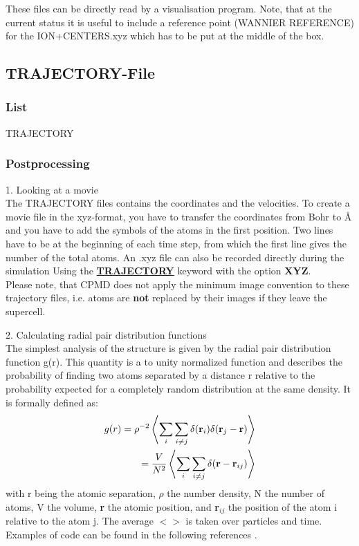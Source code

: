 \documentclass[twoside,10pt,titlepage,a4paper]{article}
\newcommand{\referto}[2]{\hyperlink{#1}{#2}}
\newcommand{\referto}[2]{\htmlref{#2}{#1}}
\newcommand{\refkeyword}[1]{%
\referto{#1}{\textbf{#1}}%
\index{#1}%
}%
\begin{document}
  These files can be directly read by a visualisation program. Note, that at
the current status it is useful to include a reference point (WANNIER
REFERENCE) for the ION+CENTERS.xyz which has to be put at the middle of the
box.

\subsection{TRAJECTORY-File}

\subsubsection{List}

TRAJECTORY

\subsubsection{Postprocessing}

1. Looking at a movie\hfill\\
The TRAJECTORY files contains the coordinates and the
velocities. To create a movie file in the xyz-format, you have to transfer the
coordinates from Bohr to {\AA} and you have to add the symbols of the atoms in
the first position. Two lines have to be at the beginning of each time step,
from which the first line gives the number of the total atoms. An .xyz
file can also be recorded directly during the simulation Using the
\refkeyword{TRAJECTORY} keyword with the option {\bf XYZ}.\\
Please note, that CPMD does not apply the minimum image convention
to these trajectory files, i.e. atoms are \textbf{not} replaced by their
images if they leave the supercell.

\medskip

 2. Calculating radial pair distribution functions\hfill\\
The simplest analysis of the structure is
given by the radial pair distribution function g(r). This quantity is a to
unity normalized function and describes the probability of finding two atoms
separated by a distance r relative to the probability expected for a completely
random distribution at the same density. It is formally defined as:
\begin{eqnarray*}
g(r)=\rho^{-2}\left < \sum_i\sum_{i\neq j} \delta({\bf r}_i)
\delta({\bf r}_j-{\bf r}) \right > \nonumber\\
= \frac{V}{N^2}\left < \sum_i\sum_{i\neq j} \delta({\bf r}-{\bf r}_{ij})
 \right >
\end{eqnarray*}
with r being the atomic separation, $\rho$ the number density, N the number of
atoms, V the volume, {\textbf r} the atomic position, and {\textbf r$_{ij}$}
the position of the atom i relative to the atom j. The average $<>$ is taken
over particles and time. Examples of code can be found in the following
references \cite{Allen87,Frenkel02}.
\end{document}
